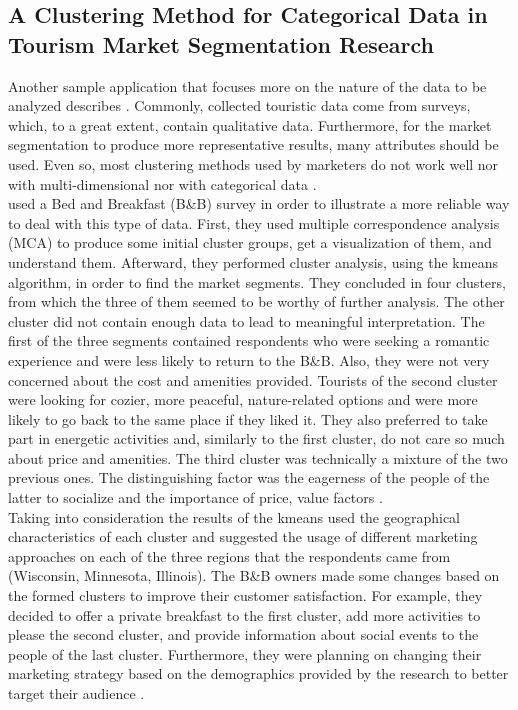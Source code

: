 \subsection{A Clustering Method for Categorical Data in Tourism Market Segmentation Research}
Another sample application that focuses more on the nature of the data to be analyzed describes \textcite{categorical}. Commonly, collected touristic data come from surveys, which, to a great extent, contain qualitative data. Furthermore, for the market segmentation to produce more representative results, many attributes should be used. Even so, most clustering methods used by marketers do not work well nor with multi-dimensional nor with categorical data \autocite[391]{categorical}. \\
\textcite{categorical} used a Bed and Breakfast (B\&B) survey in order to illustrate a more reliable way to deal with this type of data. First, they used multiple correspondence analysis (MCA) to produce some initial cluster groups, get a visualization of them, and understand them. Afterward, they performed cluster analysis, using the kmeans algorithm, in order to find the market segments. They concluded in four clusters, from which the three of them seemed to be worthy of further analysis. The other cluster did not contain enough data to lead to meaningful interpretation. The first of the three segments contained respondents who were seeking a romantic experience and were less likely to return to the B\&B. Also, they were not very concerned about the cost and amenities provided. Tourists of the second cluster were looking for cozier, more peaceful, nature-related options and were more likely to go back to the same place if they liked it. They also preferred to take part in energetic activities and, similarly to the first cluster, do not care so much about price and amenities. The third cluster was technically a mixture of the two previous ones. The distinguishing factor was the eagerness of the people of the latter to socialize and the importance of price, value factors \autocite[394-395]{categorical}. \\
Taking into consideration the results of the kmeans \textcite{categorical} used the geographical characteristics of each cluster and suggested the usage of different marketing approaches on each of the three regions that the respondents came from (Wisconsin, Minnesota, Illinois). The B\&B owners made some changes based on the formed clusters to improve their customer satisfaction. For example, they decided to offer a private breakfast to the first cluster, add more activities to please the second cluster, and provide information about social events to the people of the last cluster. Furthermore, they were planning on changing their marketing strategy based on the demographics provided by the research to better target their audience \autocite[395-396]{categorical}.